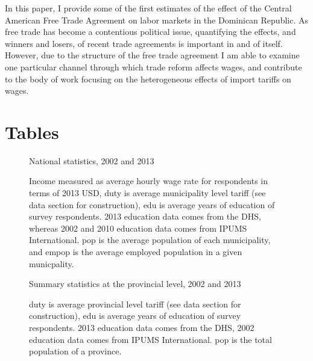 \documentclass[12pt]{article}
\begin{document}
In this paper, I provide some of the first estimates of the effect of the Central American
Free Trade Agreement on labor markets in the Dominican Republic. As free trade has become 
a contentious political issue, quantifying the effects, and winners and losers, of recent trade 
agreements is important in and of itself. However, due to the structure of the free trade
agreement I am able to examine one particular channel through which trade reform affects wages,
and contribute to the body of work focusing on the heterogeneous
effects of import tariffs on wages.

\newpage
\singlespacing



\bigskip \bigskip \bigskip
\appendix
\singlespacing

\section{Tables}
\label{sec:Tables}
\fontsize{10pt}{12pt}\selectfont

\begin{figure}[H]
\begin{center}
National statistics, 2002 and 2013

\caption{\label{fig:Summary 1}}
\end{center}
Income measured
as average hourly wage rate for respondents in terms of 2013 USD, 
duty is average municipality level tariff (see data
section for construction), edu is average years of education of survey respondents. 
2013 education data comes from the DHS, whereas 2002 and 2010 education data comes
from IPUMS International. pop is the average population of each municipality,
and empop is the average employed population in a given municpality.
\end{figure}

\begin{figure}[H]
\begin{center}
Summary statistics at the provincial level, 2002 and 2013

\caption{\label{fig:Summary 2}}
\end{center}
duty is average provincial level tariff (see data
section for construction), edu is average years of education of survey respondents. 
2013 education data comes from the DHS, 2002 education data comes
from IPUMS International. pop is the total population of a province.
\end{figure}
\end{document}
